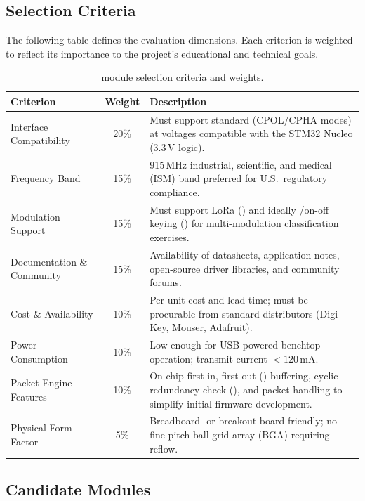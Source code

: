 \documentclass[11pt,letterpaper]{article}
\begin{document}
	\subsection{Selection Criteria}
	
	The following table defines the evaluation dimensions. Each criterion is weighted to reflect its importance to the project's educational and technical goals.
	
	\begin{table}[ht!]
		\centering
		\caption{\RF{} module selection criteria and weights.}
		\label{tab:criteria}
		\renewcommand{\arraystretch}{1.3}
		\begin{tabularx}{\textwidth}{l c X}
			\toprule
			\textbf{Criterion} & \textbf{Weight} & \textbf{Description} \\
			\midrule
			\SPI{} Interface Compatibility & 20\% & Must support standard \SPI{} (CPOL/CPHA modes) at voltages compatible with the STM32 Nucleo (3.3\,V logic). \\
			Frequency Band & 15\% & 915\,MHz industrial, scientific, and medical (ISM) band preferred for U.S.\ regulatory compliance. \\
			Modulation Support & 15\% & Must support LoRa (\CSS{}) and ideally \FSK{}/on-off keying (\OOK{}) for multi-modulation classification exercises. \\
			Documentation \& Community & 15\% & Availability of datasheets, application notes, open-source driver libraries, and community forums. \\
			Cost \& Availability & 10\% & Per-unit cost and lead time; must be procurable from standard distributors (Digi-Key, Mouser, Adafruit). \\
			Power Consumption & 10\% & Low enough for USB-powered benchtop operation; transmit current $< 120$\,mA. \\
			Packet Engine Features & 10\% & On-chip first in, first out (\FIFO{}) buffering, cyclic redundancy check (\CRC{}), and packet handling to simplify initial firmware development. \\
			Physical Form Factor & 5\% & Breadboard- or breakout-board-friendly; no fine-pitch ball grid array (BGA) requiring reflow. \\
			\bottomrule
		\end{tabularx}
	\end{table}
	
	\newpage
	\subsection{Candidate Modules}
	
\end{document}
